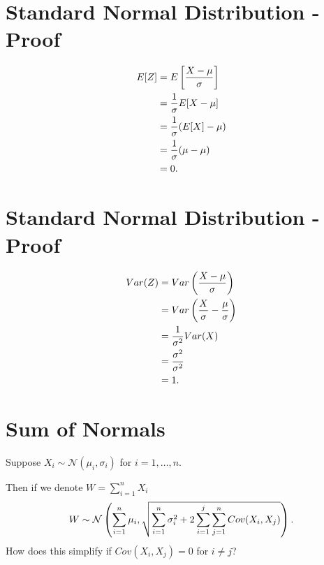 \documentclass[letterpaper,10pt,english]{sphinxmanual}
\begin{document}
\section{Standard Normal Distribution - Proof}
\label{probability:standard-normal-distribution-proof}\begin{gather}
\begin{split}E[Z] & = E\left[\frac{X - \mu}{\sigma}\right] \\
& = \frac{1}{\sigma} E[X - \mu] \\
& = \frac{1}{\sigma} (E[X] - \mu) \\
& = \frac{1}{\sigma} (\mu - \mu) \\
& = 0.\end{split}\notag
\end{gather}

\section{Standard Normal Distribution - Proof}
\label{probability:id5}\begin{gather}
\begin{split}Var(Z) & = Var\left(\frac{X - \mu}{\sigma}\right) \\
& = Var\left(\frac{X}{\sigma} - \frac{\mu}{\sigma}\right) \\
& = \frac{1}{\sigma^2} Var(X) \\
& = \frac{\sigma^2}{\sigma^2} \\
& = 1.\end{split}\notag
\end{gather}

\section{Sum of Normals}
\label{probability:sum-of-normals}
Suppose $X_i \sim \mathcal{N}(\mu_i, \sigma_i)$ for $i =
1,\ldots,n$.

Then if we denote $W = \sum_{i=1}^n X_i$
\begin{gather}
\begin{split}W \sim \mathcal{N}\left(\sum_{i=1}^n \mu_i, \sqrt{\sum_{i=1}^n
  \sigma_i^2 + 2\sum_{i=1}^j \sum_{j=1}^n Cov(X_i, X_j)}\right).\end{split}\notag
\end{gather}
How does this simplify if $Cov(X_i, X_j) = 0$ for $i \neq
j$?
\end{document}
